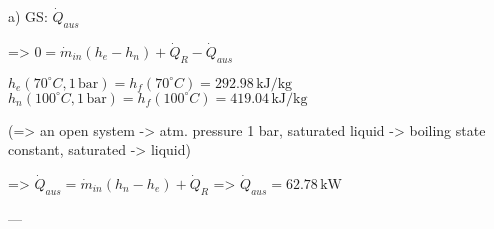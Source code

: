 a) GS: \( \dot{Q}_{aus} \)  

=> \( 0 = \dot{m}_{in} (h_e - h_n) + \dot{Q}_R - \dot{Q}_{aus} \)  

\( h_e(70^\circ C, 1 \, \text{bar}) = h_f(70^\circ C) = 292.98 \, \text{kJ/kg} \)  
\( h_n(100^\circ C, 1 \, \text{bar}) = h_f(100^\circ C) = 419.04 \, \text{kJ/kg} \)  

(=> an open system -> atm. pressure 1 bar, saturated liquid -> boiling state constant, saturated -> liquid)  

=> \( \dot{Q}_{aus} = \dot{m}_{in} (h_n - h_e) + \dot{Q}_R \)  
=> \( \dot{Q}_{aus} = 62.78 \, \text{kW} \)  

---